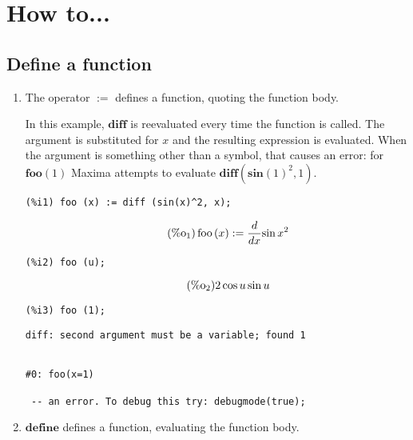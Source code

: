 \documentclass[12pt,leqno]{article}
\begin{document}
\section{How to...}

\subsection{Define a function}

\begin{enumerate}

\item The operator $\mathbf{:=}$ defines a function, quoting the function body.

In this example, $\mathbf{diff}$ is reevaluated every time the function is called.
The argument is substituted for $x$ and the resulting expression is evaluated.
When the argument is something other than a symbol, that causes an error:
for $\mathbf{foo} (1)$ Maxima attempts to evaluate $\mathbf{diff} (\mathbf{sin}(1)^2, 1)$.
\begin{verbatim}
(%i1) foo (x) := diff (sin(x)^2, x);
\end{verbatim}
\begin{equation}
\tag{$\mathop{\mathrm{\%o}}_{1}$}\mathop{\mathrm{foo}}\left(x\right) := \frac{d}{d x}{\sin x}^{2}
\label{eq:doc-group1-code26-1-1}
\end{equation}
\begin{verbatim}
(%i2) foo (u);
\end{verbatim}
\begin{equation}
\tag{$\mathop{\mathrm{\%o}}_{2}$}2 \cos u \sin u
\label{eq:doc-group1-code26-2-1}
\end{equation}
\begin{verbatim}
(%i3) foo (1);
\end{verbatim}
\begin{Verbatim}
diff: second argument must be a variable; found 1


#0: foo(x=1)

 -- an error. To debug this try: debugmode(true);
\end{Verbatim}


\item $\mathbf{define}$ defines a function, evaluating the function body.


\end{enumerate}
\end{document}

